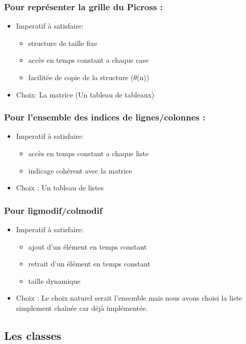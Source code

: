 \documentclass{article}
\begin{document}
\subsubsection{Pour représenter la grille du Picross :}
\begin{itemize}
\item Imperatif à satisfaire:
\begin{itemize}
\item structure de taille fixe
\item accès en temps constant a chaque case
\item facilitée de copie de la structure ($\theta$(n))
\end{itemize}
\item Choix: La matrice (Un tableau de tableaux)
\end{itemize}
\subsubsection{Pour l'ensemble des indices de lignes/colonnes :}
\begin{itemize}
\item Imperatif à satisfaire:
\begin{itemize}
\item accès en temps constant a chaque liste
\item indicage cohérent avec la matrice
\end{itemize}
\item Choix : Un tableau de listes
\end{itemize}
\subsubsection{Pour ligmodif/colmodif}
\begin{itemize}
\item Imperatif à satisfaire:
\begin{itemize}
\item ajout d'un élément en temps constant
\item retrait d'un élément en temps constant
\item taille dynamique
\end{itemize}
\item Choix :
Le choix naturel serait l'ensemble mais nous avons choisi la liste simplement chaînée car déjà implémentée.
\end{itemize}
\newpage

\subsection{Les classes}
\end{document}
